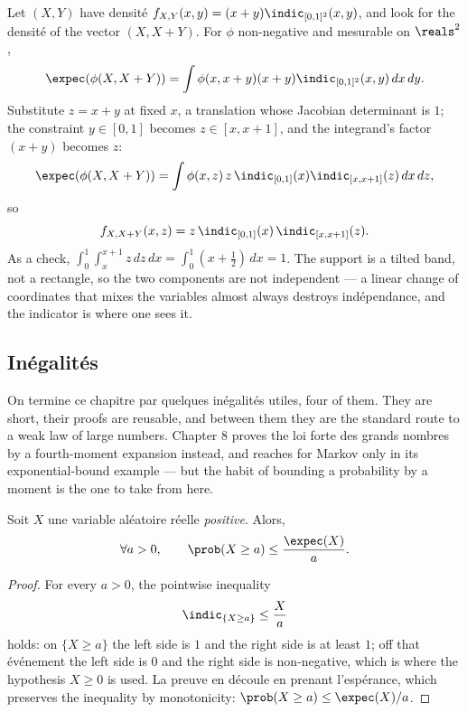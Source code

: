 \begin{example}
  Let $(X,Y)$ have densité $f_{X,Y}(x,y) = (x+y)\indic_{[0,1]^{2}}(x,y)$, and
  look for the densité of the vector $(X, X+Y)$. For $\phi$ non-negative and
  mesurable on $\reals^{2}$,
  \[
    \expec(\phi(X,X+Y)) = \int \phi(x,x+y)(x+y)\indic_{[0,1]^{2}}(x,y)\,dx\,dy .
  \]
  Substitute $z = x+y$ at fixed $x$, a translation whose Jacobian determinant is
  $1$; the constraint $y \in [0,1]$ becomes $z \in [x,x+1]$, and the integrand's
  factor $(x+y)$ becomes $z$:
  \[
    \expec(\phi(X,X+Y)) = \int \phi(x,z)\, z\, \indic_{[0,1]}(x)\indic_{[x,x+1]}(z)\,dx\,dz ,
  \]
  so
  \[
    f_{X,X+Y}(x,z) = z\,\indic_{[0,1]}(x)\,\indic_{[x,x+1]}(z).
  \]
  As a check, $\int_{0}^{1}\!\int_{x}^{x+1} z\,dz\,dx = \int_{0}^{1}(x+\tfrac12)\,dx = 1$.
  The support is a tilted band, not a rectangle, so the two components are not
  independent --- a linear change of coordinates that mixes the variables almost
  always destroys indépendance, and the indicator is where one sees it.
\end{example}

\subsection{Inégalités}

On termine ce chapitre par quelques inégalités utiles, four of them. They are
short, their proofs are reusable, and between them they are the standard route to
a weak law of large numbers. Chapter 8 proves the loi forte des grands nombres by a
fourth-moment expansion instead, and reaches for Markov only in its
exponential-bound example --- but the habit of bounding a probability by a moment
is the one to take from here.

\begin{prop}
  Soit $X$ une variable aléatoire réelle \emph{positive}. Alors,
  \[
    \forall a > 0, \qquad \prob(X \geq a) \leq \frac{\expec(X)}{a}.
  \]
\end{prop}

\begin{proof}
  For every $a > 0$, the pointwise inequality
  \[
    \indic_{\{X \geq a\}} \leq \frac{X}{a}
  \]
  holds: on $\{X \geq a\}$ the left side is $1$ and the right side is at least
  $1$; off that événement the left side is $0$ and the right side is
  non-negative, which is where the hypothesis $X \geq 0$ is used. La preuve en
  découle en prenant l'espérance, which preserves the inequality by monotonicity:
  $\prob(X \geq a) \leq \expec(X)/a$.
\end{proof}

